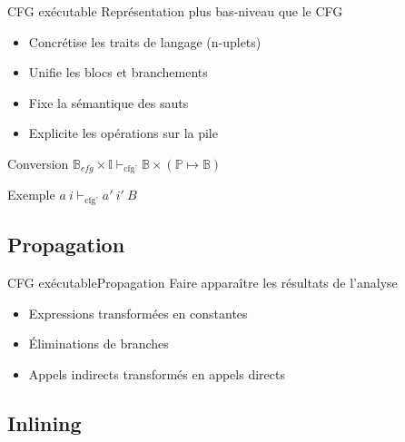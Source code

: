 \documentclass{beamer}
\begin{document}
\begin{frame}{CFG exécutable}
    Représentation plus bas-niveau que le CFG

    \begin{itemize}
        \item Concrétise les traits de langage (n-uplets)
        \item Unifie les blocs et branchements
        \item Fixe la sémantique des sauts
        \item Explicite les opérations sur la pile
    \end{itemize}

    \begin{block}{Conversion}
        $\mathbb{B}_{cfg} \times \mathbb{I} \vdash_{\text{cfg'}} \mathbb{B} \times (\mathbb{P} \mapsto \mathbb{B})$
    \end{block}

    \begin{exampleblock}{Exemple}
        $a ~ i \vdash_{\text{cfg'}} a' ~ i' ~ B$
    \end{exampleblock}
\end{frame}

\subsection{Propagation}

\begin{frame}{CFG exécutable}{Propagation}
    Faire apparaître les résultats de l'analyse

    \begin{itemize}
        \item Expressions transformées en constantes
        \item Éliminations de branches
        \item Appels indirects transformés en appels directs
    \end{itemize}
\end{frame}

\subsection{Inlining}
\end{document}
